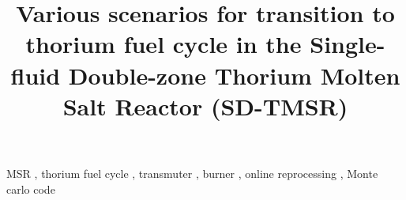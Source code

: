 \documentclass[review]{elsarticle}
\begin{document}
\begin{frontmatter}
\title{Various scenarios for transition to thorium fuel cycle in the Single-fluid Double-zone Thorium Molten Salt Reactor (SD-TMSR)}

\date{}                     %




	
\begin{keyword}
MSR \sep
thorium fuel cycle \sep
transmuter \sep
burner \sep
online reprocessing \sep
Monte carlo code
\end{keyword}



\end{frontmatter}
\glsresetall

\linenumbers



\FloatBarrier

\FloatBarrier

\FloatBarrier
%

\FloatBarrier

\FloatBarrier

\FloatBarrier


\end{document}
